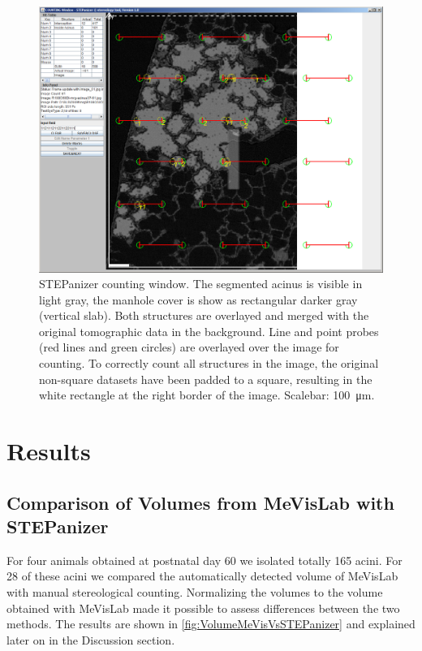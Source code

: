 \documentclass[%
	paper=a4,%
	abstract=true,%
	]{scrartcl}
\newcommand{\imsize}{\linewidth}
\begin{document}
\renewcommand{\imsize}{\linewidth}%
\begin{figure}
	\centering
	\includegraphics[width=\imsize]{img/CountingWindowSTEPanizer}
	\caption{STEPanizer counting window. The segmented acinus is visible in light gray, the manhole cover is show as rectangular darker gray (vertical slab). Both structures are overlayed and merged with the original tomographic data in the background. Line and point probes (red lines and green circles) are overlayed over the image for counting. To correctly count all structures in the image, the original non-square datasets have been padded to a square, resulting in the white rectangle at the right border of the image. Scalebar: \SI{100}{\micro\meter}.}
	\label{fig:STEPanizer}
\end{figure}

\section{Results}
\subsection{Comparison of Volumes from MeVisLab with STEPanizer}
For four animals obtained at postnatal day 60 we isolated totally 165 acini. For 28 of these acini  we compared the automatically detected volume of MeVisLab with manual stereological counting. Normalizing the volumes to the volume obtained with MeVisLab made it possible to assess differences between the two methods. The results are shown in \autoref{fig:VolumeMeVisVsSTEPanizer}  and explained later on in the Discussion section.
\end{document}
